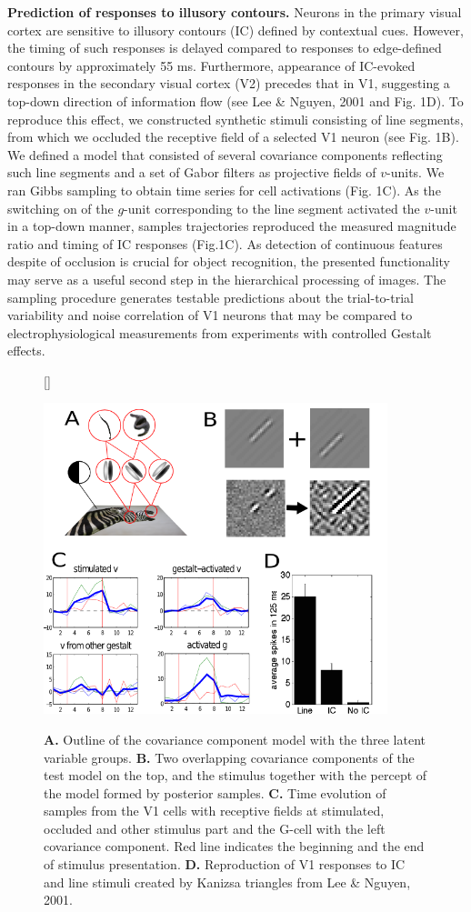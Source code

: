 \documentclass[12pt,a4paper]{article}
\begin{document}
{\bf Prediction of responses to illusory contours.} Neurons in the primary visual cortex are sensitive to illusory contours (IC) defined by contextual cues. However, the timing of such responses is delayed compared to responses to edge-defined contours by approximately 55 ms. Furthermore, appearance of IC-evoked responses in the secondary visual cortex (V2) precedes that in V1, suggesting a top-down direction of information flow (see Lee \& Nguyen, 2001 and Fig. 1D). To reproduce this effect, we constructed synthetic stimuli consisting of line segments, from which we occluded the receptive field of a selected V1 neuron (see Fig. 1B). We defined a model that consisted of several covariance components reflecting such line segments and a set of Gabor filters as projective fields of $v$-units. We ran Gibbs sampling to obtain time series for cell activations (Fig. 1C). As the switching on of the $g$-unit corresponding to the line segment activated the $v$-unit in a top-down manner, samples trajectories reproduced the measured magnitude ratio and timing of IC responses (Fig.1C). As detection of continuous features despite of occlusion is crucial for object recognition, the presented functionality may serve as a useful second step in the hierarchical processing of images. The sampling procedure generates testable predictions about the trial-to-trial variability and noise correlation of V1 neurons that may be compared to electrophysiological measurements from experiments with controlled Gestalt effects.

\begin{figure}[h]
[\FBwidth]
{\caption{{\bf A.} Outline of the covariance component model with the three latent variable groups. {\bf B.} Two overlapping covariance components of the test model on the top, and the stimulus together with the percept of the model formed by posterior samples. {\bf C.} Time evolution of samples from the V1 cells with receptive fields at stimulated, occluded and other stimulus part and the G-cell with the left covariance component. Red line indicates the beginning and the end of stimulus presentation. {\bf D.} Reproduction of V1 responses to IC and line stimuli created by Kanizsa triangles from Lee \& Nguyen, 2001.
}\label{fig:test}}
{\includegraphics[width=10cm]{cosyne_figure.png}}
\end{figure}
\end{document}
